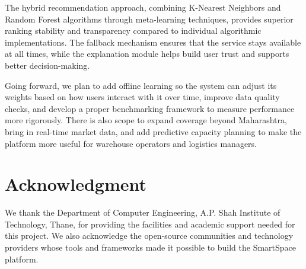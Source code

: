 \documentclass[conference]{IEEEtran}
\begin{document}
The hybrid recommendation approach, combining K-Nearest Neighbors and Random Forest algorithms through meta-learning techniques, provides superior ranking stability and transparency compared to individual algorithmic implementations. The fallback mechanism ensures that the service stays available at all times, while the explanation module helps build user trust and supports better decision-making.

Going forward, we plan to add offline learning so the system can adjust its weights based on how users interact with it over time, improve data quality checks, and develop a proper benchmarking framework to measure performance more rigorously. There is also scope to expand coverage beyond Maharashtra, bring in real-time market data, and add predictive capacity planning to make the platform more useful for warehouse operators and logistics managers.

\section*{Acknowledgment}
We thank the Department of Computer Engineering, A.P. Shah Institute of Technology, Thane, for providing the facilities and academic support needed for this project. We also acknowledge the open-source communities and technology providers whose tools and frameworks made it possible to build the SmartSpace platform.
\end{document}
